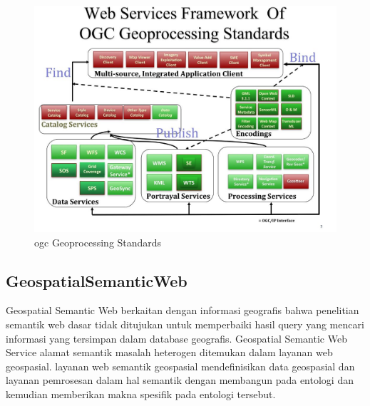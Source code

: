 \begin{figure}[ht]
	\centerline{\includegraphics[width=1\textwidth]{figures/framework.JPG}}
	\caption{ogc Geoprocessing Standards}
	\label{framework}
	\end{figure}
	
\subsection{GeospatialSemanticWeb}
Geospatial Semantic Web berkaitan dengan informasi geografis bahwa penelitian semantik web dasar tidak ditujukan untuk memperbaiki 
hasil query yang mencari informasi yang tersimpan dalam database geografis. Geospatial Semantic Web Service alamat semantik masalah heterogen ditemukan dalam layanan web geospasial. layanan web semantik geospasial mendefinisikan data geospasial dan layanan pemrosesan dalam hal semantik dengan membangun 
pada entologi dan kemudian memberikan makna spesifik pada entologi tersebut. \cite{lupp2008open} 

